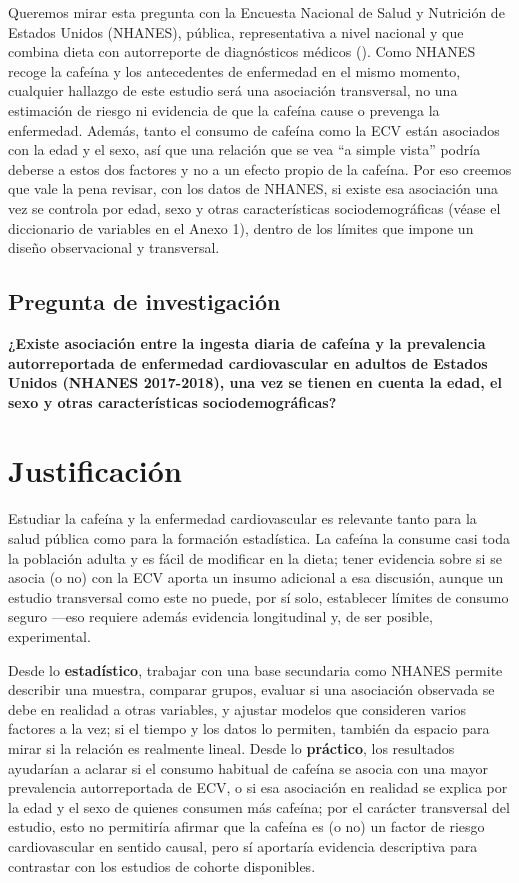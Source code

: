 \documentclass[
  spanish,
  12pt,
]{article}
\begin{document}
Queremos mirar esta pregunta con la Encuesta Nacional de Salud y
Nutrición de Estados Unidos (NHANES), pública, representativa a nivel
nacional y que combina dieta con autorreporte de diagnósticos médicos
(). Como NHANES recoge la cafeína y los antecedentes de
enfermedad en el mismo momento, cualquier hallazgo de este estudio será
una asociación transversal, no una estimación de riesgo ni evidencia de
que la cafeína cause o prevenga la enfermedad. Además, tanto el consumo
de cafeína como la ECV están asociados con la edad y el sexo, así que
una relación que se vea ``a simple vista'' podría deberse a estos dos
factores y no a un efecto propio de la cafeína. Por eso creemos que
vale la pena revisar, con los datos de NHANES, si existe esa asociación
una vez se controla por edad, sexo y otras características
sociodemográficas (véase el diccionario de variables en el Anexo 1),
dentro de los límites que impone un diseño observacional y transversal.

\subsection{Pregunta de investigación}\label{pregunta-de-investigaciuxf3n}

\textbf{¿Existe asociación entre la ingesta diaria de cafeína y la prevalencia
autorreportada de enfermedad cardiovascular en adultos de Estados Unidos
(NHANES 2017-2018), una vez se tienen en cuenta la edad, el sexo y otras
características sociodemográficas?}

\section{Justificación}\label{justificaciuxf3n}

Estudiar la cafeína y la enfermedad cardiovascular es relevante tanto
para la salud pública como para la formación estadística. La cafeína
la consume casi toda la población adulta y es fácil de modificar en la
dieta; tener evidencia sobre si se asocia (o no) con la ECV aporta un
insumo adicional a esa discusión, aunque un estudio transversal como
este no puede, por sí solo, establecer límites de consumo seguro ---eso
requiere además evidencia longitudinal y, de ser posible, experimental.

Desde lo \textbf{estadístico}, trabajar con una base secundaria como NHANES
permite describir una muestra, comparar grupos, evaluar si una
asociación observada se debe en realidad a otras variables, y ajustar
modelos que consideren varios factores a la vez; si el tiempo y los
datos lo permiten, también da espacio para mirar si la relación es
realmente lineal. Desde lo \textbf{práctico}, los resultados ayudarían a
aclarar si el consumo habitual de cafeína se asocia con una mayor
prevalencia autorreportada de ECV, o si esa asociación en realidad se
explica por la edad y el sexo de quienes consumen más cafeína; por el
carácter transversal del estudio, esto no permitiría afirmar que la
cafeína es (o no) un factor de riesgo cardiovascular en sentido causal,
pero sí aportaría evidencia descriptiva para contrastar con los
estudios de cohorte disponibles.
\end{document}
